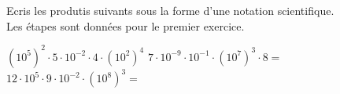 %
%
Ecris les produtis suivants sous la forme d'une notation scientifique.\\
	Les étapes sont données pour le premier exercice.
	\begin{tasks}
		\task $(10^5)^2\cdot 5\cdot 10^{-2}\cdot 4\cdot (10^2)^4$
		\task $7\cdot 10^{-9}\cdot 10^{-1}\cdot (10^7)^3\cdot 8=$
		\task $12\cdot 10^5\cdot 9\cdot 10^{-2}\cdot (10^8)^3=$
	\end{tasks}

